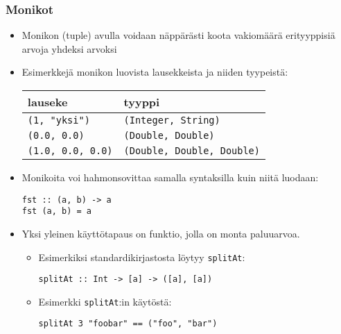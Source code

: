 \documentclass{beamer}
\begin{document}
\begin{frame}[fragile]
\frametitle{Monikot}
\begin{itemize}
\item{Monikon (tuple) avulla voidaan näppärästi koota vakiomäärä erityyppisiä arvoja yhdeksi arvoksi}

\item{Esimerkkejä monikon luovista lausekkeista ja niiden tyypeistä:}
\begin{center}
    \begin{tabular}[H]{l|l}
        lauseke                  &   tyyppi         \\
        \hline
        \texttt{(1, "yksi")}     &   \texttt{(Integer, String)}        \\
        \texttt{(0.0, 0.0)}      &   \texttt{(Double, Double)} \\
        \texttt{(1.0, 0.0, 0.0)} &   \texttt{(Double, Double, Double)} \\
    \end{tabular}
\end{center}

\item{Monikoita voi hahmonsovittaa samalla syntaksilla kuin niitä luodaan:}
\begin{verbatim}
fst :: (a, b) -> a
fst (a, b) = a
\end{verbatim}

\item{Yksi yleinen käyttötapaus on funktio, jolla on monta paluuarvoa.}
\begin{itemize}
\item{Esimerkiksi standardikirjastosta löytyy \texttt{splitAt}:}
\begin{verbatim}
splitAt :: Int -> [a] -> ([a], [a])
\end{verbatim}
\item{Esimerkki \texttt{splitAt}:in käytöstä:}
\begin{verbatim}
splitAt 3 "foobar" == ("foo", "bar")
\end{verbatim}
\end{itemize}
\end{itemize}
\end{frame}
\end{document}
